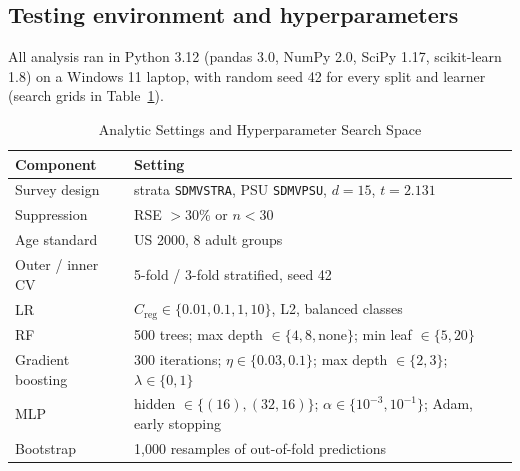 \subsection{Testing environment and hyperparameters}
All analysis ran in Python 3.12 (pandas 3.0, NumPy 2.0, SciPy 1.17, scikit-learn 1.8) on a Windows 11 laptop, with random seed 42 for every split and learner (search grids in Table~\ref{tab:hp}).

\begin{table}[t]
\caption{Analytic Settings and Hyperparameter Search Space}
\label{tab:hp}
\centering
\footnotesize
\setlength{\tabcolsep}{3pt}
\begin{tabular}{@{}p{2.3cm}p{5.6cm}@{}}
\toprule
\textbf{Component} & \textbf{Setting} \\
\midrule
Survey design & strata \texttt{SDMVSTRA}, PSU \texttt{SDMVPSU}, $d=15$, $t=2.131$ \\
Suppression & RSE $>$30\% or $n<$30 \\
Age standard & US 2000, 8 adult groups \\
Outer / inner CV & 5-fold / 3-fold stratified, seed 42 \\
LR & $C_{\mathrm{reg}}\in\{0.01,0.1,1,10\}$, L2, balanced classes \\
RF & 500 trees; max depth $\in\{4,8,\text{none}\}$; min leaf $\in\{5,20\}$ \\
Gradient boosting & 300 iterations; $\eta\in\{0.03,0.1\}$; max depth $\in\{2,3\}$; $\lambda\in\{0,1\}$ \\
MLP & hidden $\in\{(16),(32,16)\}$; $\alpha\in\{10^{-3},10^{-1}\}$; Adam, early stopping \\
Bootstrap & 1,000 resamples of out-of-fold predictions \\
\bottomrule
\end{tabular}
\end{table}
